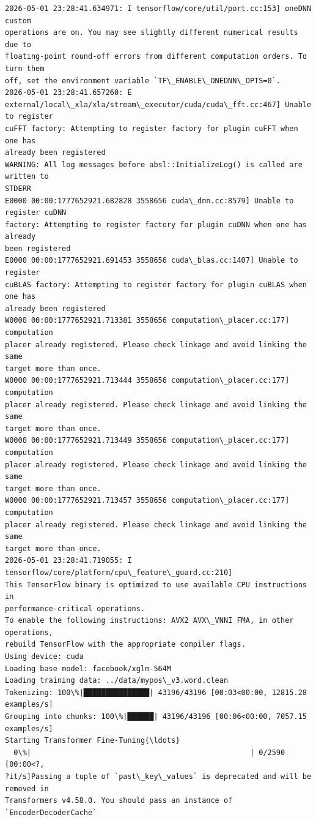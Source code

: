 \documentclass[11pt]{article}
\begin{document}
    \begin{Verbatim}[commandchars=\\\{\}]
2026-05-01 23:28:41.634971: I tensorflow/core/util/port.cc:153] oneDNN custom
operations are on. You may see slightly different numerical results due to
floating-point round-off errors from different computation orders. To turn them
off, set the environment variable `TF\_ENABLE\_ONEDNN\_OPTS=0`.
2026-05-01 23:28:41.657260: E
external/local\_xla/xla/stream\_executor/cuda/cuda\_fft.cc:467] Unable to register
cuFFT factory: Attempting to register factory for plugin cuFFT when one has
already been registered
WARNING: All log messages before absl::InitializeLog() is called are written to
STDERR
E0000 00:00:1777652921.682828 3558656 cuda\_dnn.cc:8579] Unable to register cuDNN
factory: Attempting to register factory for plugin cuDNN when one has already
been registered
E0000 00:00:1777652921.691453 3558656 cuda\_blas.cc:1407] Unable to register
cuBLAS factory: Attempting to register factory for plugin cuBLAS when one has
already been registered
W0000 00:00:1777652921.713381 3558656 computation\_placer.cc:177] computation
placer already registered. Please check linkage and avoid linking the same
target more than once.
W0000 00:00:1777652921.713444 3558656 computation\_placer.cc:177] computation
placer already registered. Please check linkage and avoid linking the same
target more than once.
W0000 00:00:1777652921.713449 3558656 computation\_placer.cc:177] computation
placer already registered. Please check linkage and avoid linking the same
target more than once.
W0000 00:00:1777652921.713457 3558656 computation\_placer.cc:177] computation
placer already registered. Please check linkage and avoid linking the same
target more than once.
2026-05-01 23:28:41.719055: I tensorflow/core/platform/cpu\_feature\_guard.cc:210]
This TensorFlow binary is optimized to use available CPU instructions in
performance-critical operations.
To enable the following instructions: AVX2 AVX\_VNNI FMA, in other operations,
rebuild TensorFlow with the appropriate compiler flags.
Using device: cuda
Loading base model: facebook/xglm-564M
Loading training data: ../data/mypos\_v3.word.clean
Tokenizing: 100\%|███████████████| 43196/43196 [00:03<00:00, 12815.28 examples/s]
Grouping into chunks: 100\%|██████| 43196/43196 [00:06<00:00, 7057.15 examples/s]
Starting Transformer Fine-Tuning{\ldots}
  0\%|                                                  | 0/2590 [00:00<?,
?it/s]Passing a tuple of `past\_key\_values` is deprecated and will be removed in
Transformers v4.58.0. You should pass an instance of `EncoderDecoderCache`

\end{Verbatim}
\end{document}
